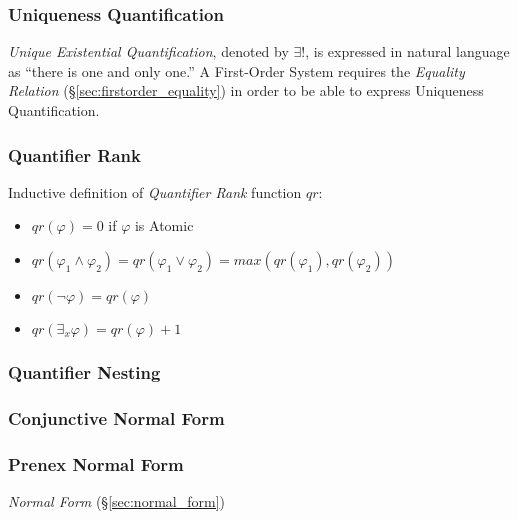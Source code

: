 \subsubsection{Uniqueness Quantification}\hfill

\emph{Unique Existential Quantification}, denoted by $\exists !$,
is expressed in natural language as ``there is one and only one.'' A
First-Order System requires the \emph{Equality Relation}
(\S\ref{sec:firstorder_equality}) in order to be able to express
Uniqueness Quantification.



\subsubsection{Quantifier Rank}

Inductive definition of \emph{Quantifier Rank} function $qr$:
\begin{itemize}
\item $qr(\varphi) = 0$ if $\varphi$ is Atomic
\item $qr(\varphi_1 \wedge \varphi_2) = qr(\varphi_1 \vee \varphi_2) = max(qr(\varphi_1),qr(\varphi_2))$
\item $qr(\neg \varphi) = qr(\varphi)$
\item $qr(\exists_x \varphi) = qr(\varphi) + 1$
\end{itemize}



\subsubsection{Quantifier Nesting}




\subsubsection{Conjunctive Normal Form}\label{sec:conjunctive_normal}



\subsubsection{Prenex Normal Form}\label{sec:prenex_normal}

\emph{Normal Form} (\S\ref{sec:normal_form})



